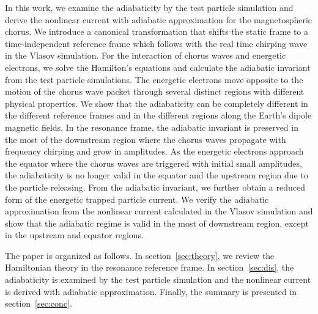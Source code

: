 In this work, we examine the adiabaticity by the test particle simulation and derive the nonlinear current with adiabatic approximation for 
the magnetospheric chorus.
We introduce a canonical transformation that shifts the static frame to a time-independent reference frame which follows with the real time chirping wave in the Vlasov simulation.
For the interaction of chorus waves and energetic electrons,
we solve the Hamilton's equations and calculate the adiabatic invariant from the test particle simulations.
The energetic electrons move opposite to the motion of the chorus wave packet through several distinct regions with different physical properties.
We show that the adiabaticity can be completely different in the different reference frames and in the different regions  along the Earth's dipole magnetic fields. 
In the resonance frame,  the adiabatic invariant is preserved in the most of the  downstream region where the   chorus waves  propagate with frequency chirping and grow in amplitudes.
As the energetic electrons approach the equator
where the chorus waves are triggered with initial small amplitudes,
the adiabaticity  is no longer valid in the equator and the upstream region  due to the particle releasing.
From the adiabatic invariant, we further obtain a reduced  form of the energetic trapped particle current.
We verify the adiabatic approximation from the nonlinear current calculated in the Vlasov simulation and show that the adiabatic regime is valid in the most of downstream region, except in the upstream and equator regions.

The paper is organized as follows. In section~\ref{sec:theory}, we review the Hamiltonian theory in the resonance reference frame. In section~\ref{sec:dis},  
the adiabaticity 
is examined by the test particle simulation and  the nonlinear current 
is derived with adiabatic approximation. Finally, the summary is presented in section~\ref{sec:conc}.

